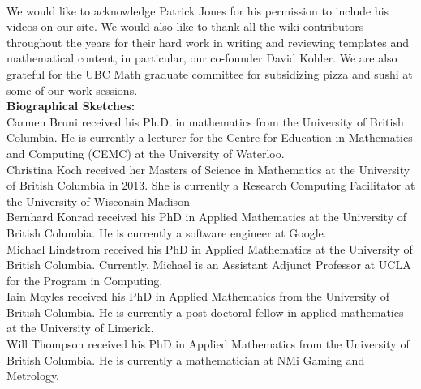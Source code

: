 \documentclass[10pt]{article}
\begin{document}
\\[1cm]
\noindent{}We would like to acknowledge Patrick Jones for his permission to include his videos on our site. We would also like to thank all the wiki contributors throughout the years for their hard work in writing and reviewing templates and mathematical content, in particular, our co-founder David Kohler. We are also grateful for the UBC Math graduate committee for subsidizing pizza and sushi at some of our work sessions.
\\[1cm]
\textbf{Biographical Sketches:}\\
Carmen Bruni received his Ph.D. in mathematics from the University of British Columbia. He is currently a lecturer for the Centre for Education in Mathematics and Computing (CEMC) at the University of Waterloo.
\\[0.5cm]
Christina Koch received her Masters of Science in Mathematics at the University of British Columbia in 2013.  She is currently a Research Computing Facilitator at the University of Wisconsin-Madison
\\[0.5cm]
Bernhard Konrad received his PhD in Applied Mathematics at the University of British Columbia.  He is currently a software engineer at Google.
\\[0.5cm]
Michael Lindstrom received his PhD in Applied Mathematics at the University of British Columbia.  Currently, Michael is an Assistant Adjunct Professor at UCLA for the Program in Computing.
\\[0.5cm]
Iain Moyles received his PhD in Applied Mathematics from the University of British Columbia.   He is currently a post-doctoral fellow in applied mathematics at the University of Limerick.
\\[0.5cm]
Will Thompson received his PhD in Applied Mathematics from the University of British Columbia.  He is currently a mathematician at NMi Gaming and Metrology.
\\[0.5cm]
\end{document}

